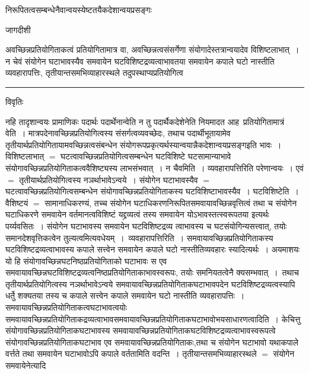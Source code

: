 \documentclass[10pt, openany]{book}
\begin{document}
{निरूपितत्वसम्बन्धेनैवान्वयस्येष्टतयैकदेशान्वयप्रसङ्गः
\newpage
\begin{center} जागदीशी \end{center}
{\la अवच्छिन्नप्रतियोगिताकत्वं प्रतियोगितामात्र वा, अवच्छिन्नत्वसंसर्गेणा
संयोगादेस्तत्रान्वयादेव विशिष्टलाभात्~। न चेवं संयोगेन घटाभावस्यैव
समवायेन घटविशिष्टद्रव्यत्वाभावतया समवायेन कपाले घटो नास्तीति
व्यवहारापत्तिः, तृतीयान्तसमभिव्याहारस्थले तदुपस्थाप्यप्रतियोगित्व}\\
\hrule
\begin{center}     विवृतिः \end{center}
नहि तादृशान्वयः प्रामाणिकः {\qt पदार्थः पदार्थेनान्वेति न तु
पदार्थैकदेशेनेति}
नियमादत आह\textendash\ {\la प्रतियोगितामात्रं वेति~।} मात्रपदेनावच्छिन्नप्रतियोगित्वस्य
संसर्गत्वव्यवच्छेदः, तथाच पदार्थीभूतायामेव
तृतीयार्थप्रतियोगितायामवच्छिन्नत्वसंबन्धेन संयोगरूपप्रकृत्यर्थस्यान्वयान्नैकदेशान्वयप्रसङ्गइति भावः~।
विशिष्टलाभात् $=$ घटत्वावच्छिन्नप्रतियोगित्वसम्बन्धेन घटविशिष्टे घटसामान्याभावे
संयोगावच्छिन्नप्रतियोगिताकत्ववैशिष्ट्यस्य लाभसंभवात्~। न {\la चैवमिति~।} व्यवहारापत्तिरिति परेणान्वयः~। एवं $=$ तृतीयार्थप्रतियोगित्वस्य नञर्थाभावेऽन्वये~।
संयोगेन घटाभावस्यैव $=$ घटत्वावच्छिन्नप्रतियोगित्वसम्बन्धेन
संयोगावच्छिन्नप्रतियोगिताकस्य घटविशिष्टाभावस्यैव~। {\qt घटविशिष्टेति}~। वैशिष्टयं $=$ सामानाधिकरण्यं, तच्च
संयोगेन घटाधिकरणनिरूपितसमवायावच्छिन्नवृत्तित्वं तथा च संयोगेन घटाधिकरणे समवायेन वर्तमानत्वविशिष्टं यद्द्रव्यत्वं तस्य समवायेन
योऽभावस्तत्स्वरूपतया इत्यर्थः पर्य्यवसितः~। संयोगेन घटाभावस्य समवायेन घटविशिष्टद्रव्य
त्वाभावस्य च घटसंयोगिन्यसत्त्वात्, तयोः समानदेशवृत्तिकत्वेन
तुल्यत्वमित्यवधेयम्~।~{\la व्यवहारापत्तिरिति~।} समवायावच्छिन्नप्रतियोगिताकस्य घटविशिष्टद्रव्यत्वाभावस्य कपाले सत्त्वेन समवायेन कपाले घटो नास्तीतिव्यवहारः
स्यादित्यर्थः~।
{\qt अयमाशयः} यो हि संयोगावच्छिन्नघटनिष्ठप्रतियोगिताको घटाभावः स एव समवायावच्छिन्नघटविशिष्टद्रव्यत्वनिष्ठप्रतियोगिताकाभावस्वरूपः, तयोः
समनियतत्वेनै
क्यसम्भवात्~।~तथाच तृतीयार्थप्रतियोगित्वस्य नञर्थाभावेऽन्वये
समवायावच्छिन्नप्रतियोगिताकघटाभावपदेन घटविशिष्टद्रव्यत्वस्यापि धर्तेु शक्यतया तस्य च कपाले सत्त्वेन कपाले समवायेन घटो नास्तीति व्यवहारापत्तिः~।
समवायावच्छिन्नप्रतियोगिताकत्वघटाभावत्वयोः
समवायावच्छिन्नप्रतियोगिताकद्रव्यत्वाभावसमवायावच्छिन्नप्रतियोगिताकघटाभावोभयसाधारणत्वादिति~। {\la केचित्तु} संयोगावच्छिन्नप्रतियोगिताकघटाभावस्य
समवायावच्छिन्नप्रतियोगिताकघटविशिष्टद्रव्यत्वाभावस्वरूपत्वे संयोगावच्छिन्नप्रतियोगिताकघटाभाव एव
समवायावच्छिन्नप्रतियोगिताकः,तथा च संयोगेन घटाभावो यथाकपाले वर्त्तते तथा समवायेन घटाभावोऽपि कपाले वर्ततामिति वदन्ति~। तृतीयान्तसमभिव्याहारस्थले $=$ संयोगेन समवायेनेत्यादि
}
\end{document}
